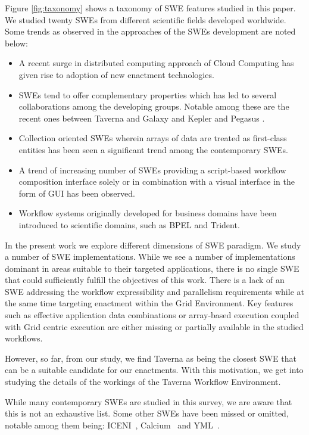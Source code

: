 Figure \ref{fig:taxonomy} shows a taxonomy of SWE features studied in this
paper. We studied twenty SWEs from different scientific fields developed
worldwide. Some trends as observed in the approaches of the SWEs development
are noted below:

\begin{itemize}
 \item A recent surge in distributed computing approach of Cloud Computing has
     given rise to adoption of new enactment technologies. 

 \item SWEs tend to offer complementary properties which has led to several
     collaborations among the developing groups. Notable among these are the
     recent ones between Taverna and Galaxy \cite{mohamed-alaa-etal:2010} and
     Kepler and Pegasus \cite{mandal-deelman-etal:2007}.
 
 \item Collection oriented SWEs wherein arrays of data are treated as
     first-class entities has been seen a significant trend among the
     contemporary SWEs.
 
 \item A trend of increasing number of SWEs providing a script-based workflow
     composition interface solely or in combination with a visual interface in
     the form of GUI has been observed.
 
 \item Workflow systems originally developed for business domains have been
     introduced to scientific domains, such as BPEL and Trident.
\end{itemize}

In the present work we explore different dimensions of SWE paradigm. We study a
number of SWE implementations. While we see a number of implementations
dominant in areas suitable to their targeted applications, there is no single
SWE that could sufficiently fulfill the objectives of this work. There is a
lack of an SWE addressing the workflow expressibility and parallelism
requirements while at the same time targeting enactment within the Grid
Environment. Key features such as effective application data combinations or
array-based execution coupled with Grid centric execution are either missing or
partially available in the studied workflows. 

However, so far, from our study, we find Taverna as being the closest SWE that
can be a suitable candidate for our enactments. With this motivation, we get
into studying the details of the workings of the Taverna Workflow Environment. 

While many contemporary SWEs are studied in this survey, we are aware that this
is not an exhaustive list. Some other SWEs have been missed or omitted, notable
among them being: ICENI~\cite{furmento-mayer-etal:2002},
Calcium~\cite{caromel-henrio-etal:2008} and YML~\cite{delannoy-emad-etal:2006}.

